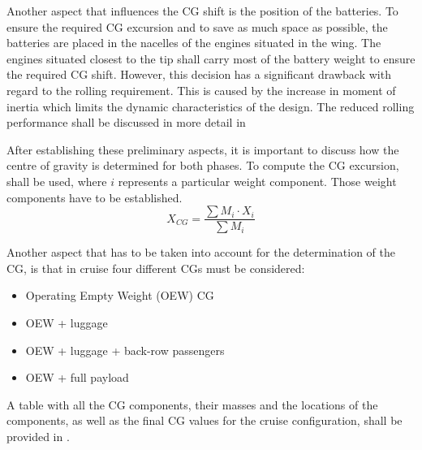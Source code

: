 Another aspect that influences the CG shift is the position of the batteries.
To ensure the required CG excursion and to save as much space as possible, the batteries are placed in the nacelles of the engines situated in the wing.
The engines situated closest to the tip shall carry most of the battery weight to ensure the required CG shift.
However, this decision has a significant drawback with regard to the rolling requirement.
This is caused by the increase in moment of inertia which limits the dynamic characteristics of the design.
The reduced rolling performance shall be discussed in more detail in 

After establishing these preliminary aspects, it is important to discuss how the centre of gravity is determined for both phases.
To compute the CG excursion,  shall be used, where $i$ represents a particular weight component.
Those weight components have to be established.
\begin{equation}
    \label{eq:CG_excursion}
    X_{CG}=\frac{\sum M_i \cdot X_i}{\sum M_i}
\end{equation}

Another aspect that has to be taken into account for the determination of the CG, is that in cruise four different CGs must be considered:
\begin{itemize}
    \item Operating Empty Weight (OEW) CG
    \item OEW + luggage
    \item OEW + luggage + back-row passengers
    \item OEW + full payload
\end{itemize}

A table with all the CG components,
their masses and the locations of the components, as well as the final CG values for the cruise configuration, shall be provided in .


